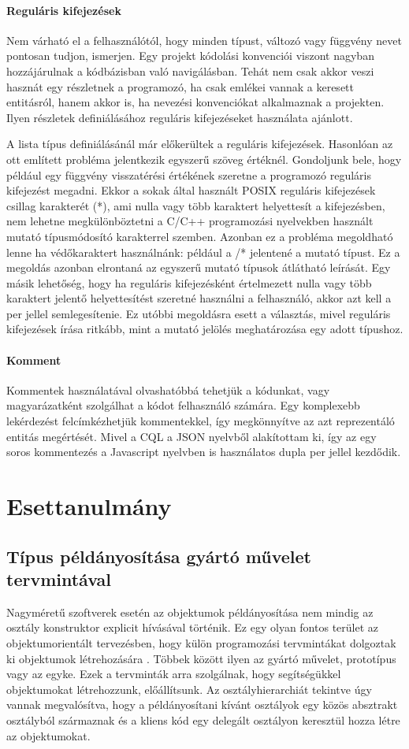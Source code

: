 \documentclass[a4paper,12pt]{report}
\begin{document}
\subsubsection{Reguláris kifejezések}
Nem várható el a felhasználótól, hogy minden típust, változó vagy függvény nevet pontosan tudjon, ismerjen. Egy projekt kódolási konvenciói viszont nagyban hozzájárulnak a kódbázisban való navigálásban. Tehát nem csak akkor veszi hasznát egy részletnek a programozó, ha csak emlékei vannak a keresett entitásról, hanem akkor is, ha nevezési konvenciókat alkalmaznak a projekten. Ilyen részletek definiálásához reguláris kifejezéseket használata ajánlott.
\par A lista típus definiálásánál már előkerültek a reguláris kifejezések. Hasonlóan az ott említett probléma jelentkezik egyszerű szöveg értéknél. Gondoljunk bele, hogy például egy függvény visszatérési értékének szeretne a programozó reguláris kifejezést megadni. Ekkor a sokak által használt POSIX reguláris kifejezések csillag karakterét (*), ami nulla vagy több karaktert helyettesít a kifejezésben, nem lehetne megkülönböztetni a C/C++ programozási nyelvekben használt mutató típusmódosító karakterrel szemben. Azonban ez a probléma megoldható lenne ha védőkaraktert használnánk: például a /* jelentené a mutató típust. Ez a megoldás azonban elrontaná az egyszerű mutató típusok átlátható leírását. Egy másik lehetőség, hogy ha reguláris kifejezésként értelmezett nulla vagy több karaktert jelentő helyettesítést szeretné használni a felhasználó, akkor azt kell a per jellel semlegesítenie. Ez utóbbi megoldásra esett a választás, mivel reguláris kifejezések írása ritkább, mint a mutató jelölés meghatározása egy adott típushoz.
\subsubsection{Komment}
Kommentek használatával olvashatóbbá tehetjük a kódunkat, vagy magyarázatként szolgálhat a kódot felhasználó számára. Egy komplexebb lekérdezést felcímkézhetjük kommentekkel, így megkönnyítve az azt reprezentáló entitás megértését. Mivel a CQL a JSON nyelvből alakítottam ki, így az egy soros kommentezés a Javascript nyelvben is használatos dupla per jellel kezdődik.

\chapter{Esettanulmány}
\section{Típus példányosítása gyártó művelet tervmintával}
Nagyméretű szoftverek esetén az objektumok példányosítása nem mindig az osztály konstruktor explicit hívásával történik. Ez egy olyan fontos terület az objektumorientált tervezésben, hogy külön programozási tervmintákat dolgoztak ki objektumok létrehozására \cite{design_patterns}. Többek között ilyen az gyártó művelet, prototípus vagy az egyke. Ezek a tervminták arra szolgálnak, hogy segítségükkel objektumokat létrehozzunk, előállítsunk. Az osztályhierarchiát tekintve úgy vannak megvalósítva, hogy a példányosítani kívánt osztályok egy közös absztrakt osztályból származnak és a kliens kód egy delegált osztályon keresztül hozza létre az objektumokat.
\end{document}
